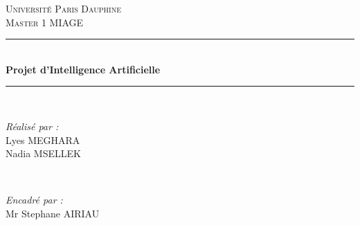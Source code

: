 \begin{titlepage} %
	\newcommand{\HRule}{\rule{\linewidth}{0.5mm}} %
	
	\center %
	
	
	\textsc{\LARGE Université Paris Dauphine}\\[1.5cm] %
	
	\textsc{\Large Master 1 MIAGE}\\[0.5cm] %
	

	
	
	\HRule\\[0.4cm]
	
	{\huge\bfseries Projet d'Intelligence Artificielle}\\[0.4cm] %
	
	\HRule\\[1.5cm]
	
	
	\begin{minipage}{0.4\textwidth}
		\begin{flushleft}
			\large
			\textit{Réalisé par :}\\
			Lyes \textsc{MEGHARA}\\ %
			Nadia \textsc{MSELLEK}\\ %
		\end{flushleft}
	\end{minipage}
	~
	\begin{minipage}{0.4\textwidth}
		\begin{flushright}
			\large
			\textit{Encadré par :}\\
			Mr Stephane \textsc{AIRIAU}%

		\end{flushright}
	\end{minipage}
	
	

\end{titlepage}
